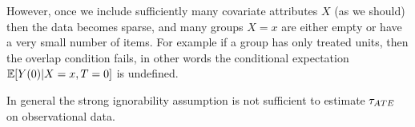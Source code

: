 However, once we include sufficiently many covariate attributes $X$
(as we should) then the data becomes sparse, and many groups $X=x$ are
either empty or have a very small number of items.  For example if a
group has only treated units, then the overlap condition fails, in
other words the conditional expectation $\mathbb{E}[Y(0)|X=x,T=0]$ is
undefined.
  In general the
strong ignorability assumption is not sufficient to estimate ${\tau_{ATE}}$ on
observational data.
\vspace{-0.3cm}
